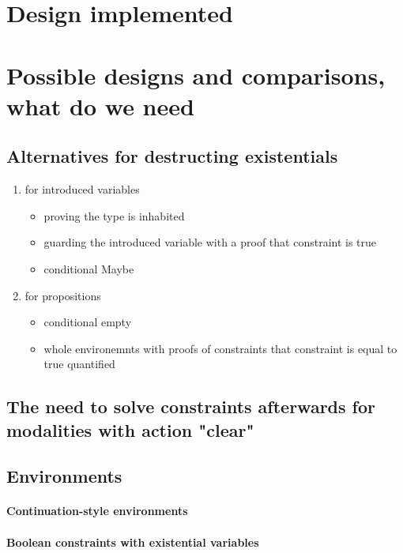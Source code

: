 \section{Design implemented}

\section{Possible designs and comparisons, what do we need}

\subsection{Alternatives for destructing existentials}
\label{sec:design_decisions_existential}


\begin{enumerate}
\item for introduced variables

\begin{itemize}
\item proving the type is inhabited
\item guarding the introduced variable with a proof that constraint is true
\item conditional Maybe
\end{itemize}
\item for propositions

\begin{itemize}
\item conditional empty
\item whole environemnts with proofs of constraints that constraint is equal to true quantified
\end{itemize}
\end{enumerate}

\subsection{The need to solve constraints afterwards for modalities with action "clear"}

\subsection{Environments}

\paragraph{Continuation-style environments}

\paragraph{Boolean constraints with existential variables}


